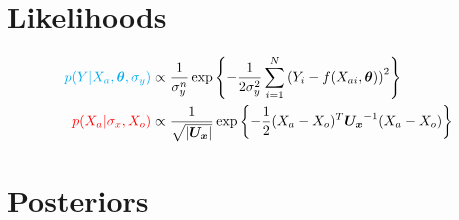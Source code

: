 \documentclass[10pt]{article}
\renewcommand{\vec}[1]{\boldsymbol{#1}}
\newcommand{\mat}[1]{\boldsymbol{#1}}
\begin{document}
\section{Likelihoods}
\begin{align}
    {\color{cyan} p(Y | X_a, \vec{\theta}, \sigma_y)} &\propto \frac{1}{\sigma_y^n} \exp\left\{ - \frac{1}{2\sigma_y^2} \sum_{i=1}^N \left( Y_i - f(X_{ai}, \vec{\theta}) \right)^2 \right\} \\
    {\color{red} p(X_a | \sigma_x, X_o)} &\propto \frac{1}{\sqrt{|\mat{U_x}|}} \exp\left\{ - \frac{1}{2} (X_a - X_o)^T \mat{U_x}^{-1} (X_a - X_o) \right\}
\end{align}    

\section{Posteriors}
\end{document}
